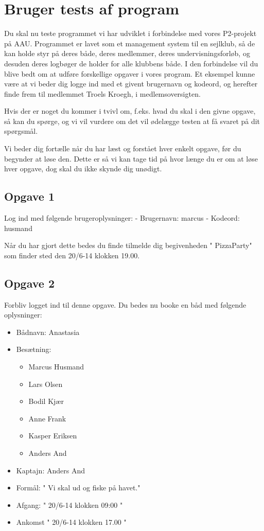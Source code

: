 \chapter{Bruger tests af program}\label{BrugerTestCases}

Du skal nu teste programmet vi har udviklet i forbindelse med vores P2-projekt på AAU. Programmet er lavet som et management system til en sejlklub, så de kan holde styr på deres både, deres medlemmer, deres undervisningsforløb, og desuden deres logbøger de holder for alle klubbens både. I den forbindelse vil du blive bedt om at udføre forskellige opgaver i vores program. Et eksempel kunne være at vi beder dig logge ind med et givent brugernavn og kodeord, og herefter finde frem til medlemmet Troels Kroegh, i medlemsoversigten.

Hvis der er noget du kommer i tvivl om, f.eks. hvad du skal i den givne opgave, så kan du spørge, og vi vil vurdere om det vil ødelægge testen at få svaret på dit spørgsmål.

Vi beder dig fortælle når du har læst og forstået hver enkelt opgave, før du begynder at løse den.
Dette er så vi kan tage tid på hvor længe du er om at løse hver opgave, dog skal du ikke skynde dig unødigt.


\section{Opgave 1}

Log ind med følgende brugeroplysninger: 
\newline - Brugernavn: marcus
\newline - Kodeord: husmand

Når du har gjort dette bedes du finde tilmelde dig begivenheden " PizzaParty" som finder sted den 20/6-14  klokken 19.00.

\section{Opgave 2}

Forbliv logget ind til denne opgave. Du bedes nu booke en båd med følgende oplysninger:

\begin{itemize}
	\item Bådnavn: Anastasia
	\item Besætning: 
	\begin{itemize}
		\item Marcus Husmand
		\item Lars Olsen
		\item Bodil Kjær
		\item Anne Frank
		\item Kasper Eriksen
		\item Anders And
	\end{itemize}
	\item Kaptajn: Anders And
	\item Formål: " Vi skal ud og fiske på havet."
	\item Afgang: " 20/6-14 klokken 09:00 " 
	\item Ankomst " 20/6-14 klokken 17.00 "
\end{itemize}


